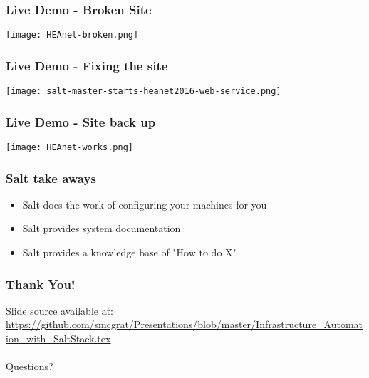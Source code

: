 \documentclass{beamer}
\begin{document}
\begin{frame}[fragile]
\frametitle{Live Demo - Broken Site}
\texttt{[image: HEAnet-broken.png]}
\end{frame}

\begin{frame}[fragile]
\frametitle{Live Demo - Fixing the site}
\texttt{[image: salt-master-starts-heanet2016-web-service.png]}
\end{frame}


\begin{frame}[fragile]
\frametitle{Live Demo - Site back up}
\texttt{[image: HEAnet-works.png]}
\end{frame}

\begin{frame}
\frametitle{Salt take aways}
\begin{itemize}
\item Salt does the work of configuring your machines for you
\item Salt provides system documentation
\item Salt provides a knowledge base of "How to do X"
\end{itemize}
\end{frame}

\begin{frame}[fragile]
\frametitle{Thank You!}
Slide source available at: \url{https://github.com/smcgrat/Presentations/blob/master/Infrastructure_Automation_with_SaltStack.tex} \\~\\
Questions?
\end{frame}
\end{document}
